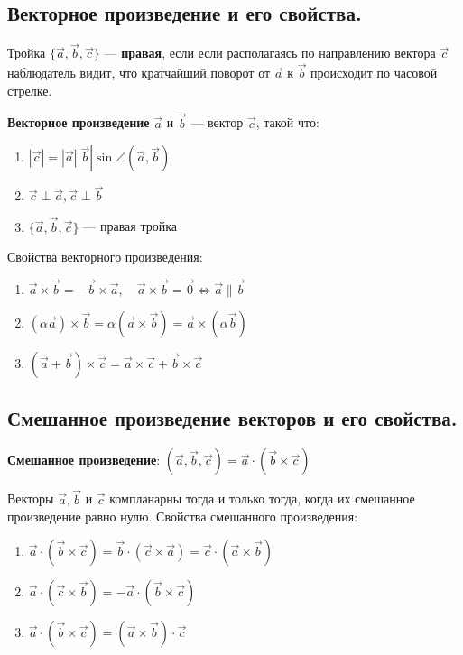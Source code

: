 \subsection{Векторное произведение и его свойства.}
\begin{definition}
    Тройка $\{\vec a, \vec b, \vec c\}$ --- \textbf{правая}, если если располагаясь по направлению вектора $\vec c$ наблюдатель видит, что кратчайший поворот от $\vec a$ к
    $\vec b$ происходит по часовой стрелке.
\end{definition}
\begin{definition}
    \textbf{Векторное произведение} $\vec a$ и $\vec b$ --- вектор $\vec c$, такой что:
    \begin{enumerate}
        \item $|\vec c|=|\vec a||\vec b|\sin\angle(\vec a, \vec b)$
        \item $\vec c\perp \vec a, \vec c\perp \vec b$
        \item $\{\vec a, \vec b, \vec c\}$ --- правая тройка
    \end{enumerate}
\end{definition}
Свойства векторного произведения:
\begin{enumerate}
    \item $\vec a\times \vec b=-\vec b\times \vec a, \quad \vec a\times \vec b=\vec 0 \Leftrightarrow \vec a\parallel\vec b$
    \item $(\alpha\vec a)\times \vec b=\alpha(\vec a\times \vec b)=\vec a\times (\alpha\vec b)$
    \item $(\vec a + \vec b)\times \vec c=\vec a\times \vec c+\vec b\times \vec c$
\end{enumerate}

\subsection{Смешанное произведение векторов и его свойства.}
\begin{definition}
    \textbf{Смешанное произведение}: $(\vec a, \vec b, \vec c)=\vec a \cdot (\vec b \times \vec c)$
\end{definition}
Векторы $\vec a, \vec b$ и $\vec c$ компланарны тогда и только тогда, когда их смешанное произведение равно нулю.
Свойства смешанного произведения:
\begin{enumerate}
    \item $\vec a\cdot (\vec b \times \vec c)=\vec b\cdot (\vec c \times \vec a)=\vec c\cdot (\vec a \times \vec b)$
    \item $\vec a\cdot (\vec c \times \vec b)=-\vec a\cdot (\vec b \times \vec c)$
    \item $\vec a\cdot (\vec b \times \vec c)=(\vec a \times \vec b)\cdot \vec c$
\end{enumerate}

